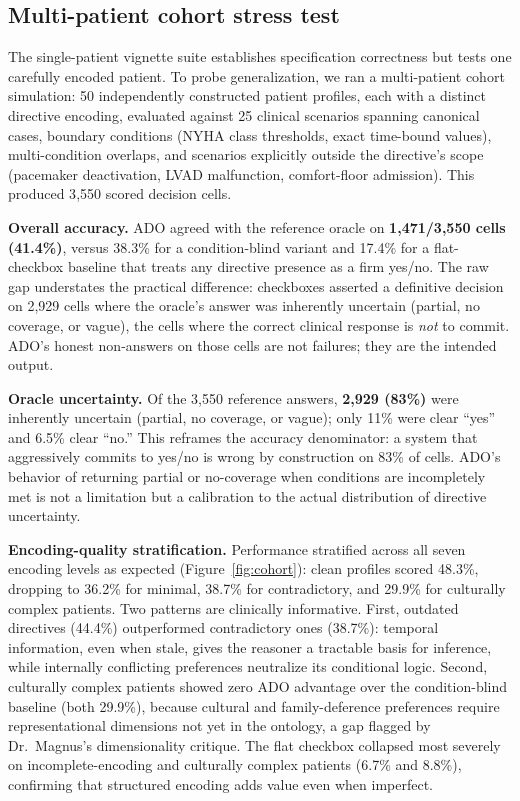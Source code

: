 \documentclass[10pt]{article}
\begin{document}
\subsection{Multi-patient cohort stress test}
The single-patient vignette suite establishes specification correctness but tests one carefully encoded patient. To probe generalization, we ran a multi-patient cohort simulation: 50 independently constructed patient profiles, each with a distinct directive encoding, evaluated against 25 clinical scenarios spanning canonical cases, boundary conditions (NYHA class thresholds, exact time-bound values), multi-condition overlaps, and scenarios explicitly outside the directive's scope (pacemaker deactivation, LVAD malfunction, comfort-floor admission). This produced 3{,}550 scored decision cells.

\textbf{Overall accuracy.} ADO agreed with the reference oracle on \textbf{1{,}471/3{,}550 cells (41.4\%)}, versus 38.3\% for a condition-blind variant and 17.4\% for a flat-checkbox baseline that treats any directive presence as a firm yes/no. The raw gap understates the practical difference: checkboxes asserted a definitive decision on 2{,}929 cells where the oracle's answer was inherently uncertain (partial, no coverage, or vague), the cells where the correct clinical response is \emph{not} to commit. ADO's honest non-answers on those cells are not failures; they are the intended output.

\textbf{Oracle uncertainty.} Of the 3{,}550 reference answers, \textbf{2{,}929 (83\%)} were inherently uncertain (partial, no coverage, or vague); only 11\% were clear ``yes'' and 6.5\% clear ``no.'' This reframes the accuracy denominator: a system that aggressively commits to yes/no is wrong by construction on 83\% of cells. ADO's behavior of returning partial or no-coverage when conditions are incompletely met is not a limitation but a calibration to the actual distribution of directive uncertainty.

\textbf{Encoding-quality stratification.} Performance stratified across all seven encoding levels as expected (Figure~\ref{fig:cohort}): clean profiles scored 48.3\%, dropping to 36.2\% for minimal, 38.7\% for contradictory, and 29.9\% for culturally complex patients. Two patterns are clinically informative. First, outdated directives (44.4\%) outperformed contradictory ones (38.7\%): temporal information, even when stale, gives the reasoner a tractable basis for inference, while internally conflicting preferences neutralize its conditional logic. Second, culturally complex patients showed zero ADO advantage over the condition-blind baseline (both 29.9\%), because cultural and family-deference preferences require representational dimensions not yet in the ontology, a gap flagged by Dr.\ Magnus's dimensionality critique. The flat checkbox collapsed most severely on incomplete-encoding and culturally complex patients (6.7\% and 8.8\%), confirming that structured encoding adds value even when imperfect.
\end{document}
